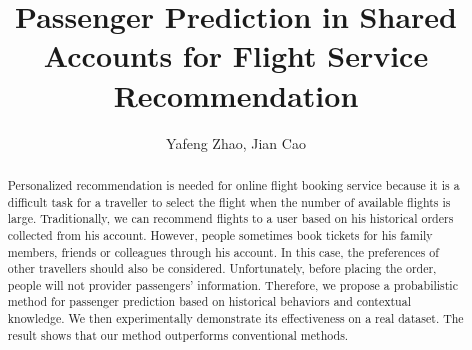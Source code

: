 \documentclass{llncs}
\begin{document}
\title{Passenger Prediction in Shared Accounts for Flight Service Recommendation}

%


\author{Yafeng Zhao, Jian Cao}


\maketitle
\begin{abstract}
Personalized recommendation is needed for online flight booking service because it is a difficult task for a traveller to select the flight when the number of available flights is large. Traditionally, we can recommend flights to a user based on his historical orders collected from his account. However, people sometimes book tickets for his family members, friends or colleagues through his account. In this case, the preferences of other travellers should also be considered. Unfortunately, before placing the order, people will not provider passengers' information. Therefore, we propose a probabilistic method for passenger prediction based on historical behaviors and contextual knowledge. We then experimentally demonstrate its effectiveness on a real dataset. The result shows that our method outperforms conventional methods.\\
\end{abstract}
\end{document}
